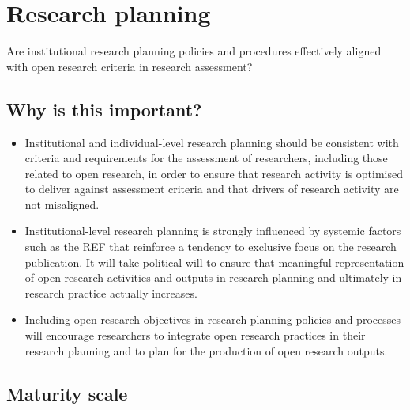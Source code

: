 \documentclass[
  letterpaper,
  DIV=11,
  numbers=noendperiod,
  oneside]{scrreprt}
\begin{document}
\chapter{Research planning}\label{research-planning}

\begin{tcolorbox}[enhanced jigsaw, colback=white, toprule=.15mm, colframe=quarto-callout-color-frame, arc=.35mm, opacityback=0, bottomrule=.15mm, breakable, left=2mm, leftrule=.75mm, rightrule=.15mm]

Are institutional research planning policies and procedures effectively
aligned with open research criteria in research assessment?

\end{tcolorbox}

\section{Why is this important?}\label{why-is-this-important-8}

\begin{itemize}
\item
  Institutional and individual-level research planning should be
  consistent with criteria and requirements for the assessment of
  researchers, including those related to open research, in order to
  ensure that research activity is optimised to deliver against
  assessment criteria and that drivers of research activity are not
  misaligned.
\item
  Institutional-level research planning is strongly influenced by
  systemic factors such as the REF that reinforce a tendency to
  exclusive focus on the research publication. It will take political
  will to ensure that meaningful representation of open research
  activities and outputs in research planning and ultimately in research
  practice actually increases.
\item
  Including open research objectives in research planning policies and
  processes will encourage researchers to integrate open research
  practices in their research planning and to plan for the production of
  open research outputs.
\end{itemize}

\section{Maturity scale}\label{maturity-scale-8}
\end{document}
